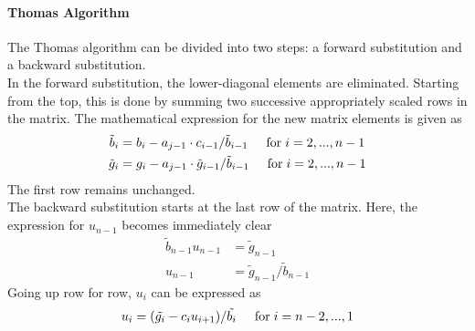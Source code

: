 \documentclass[%
oneside,                 %
final,                   %
10pt]{article}
\begin{document}
\paragraph{Thomas Algorithm}
The Thomas algorithm can be divided into two steps: a forward substitution and a backward substitution.\\
In the forward substitution, the lower-diagonal elements are eliminated. Starting from the top, this is done by summing two successive appropriately scaled rows in the matrix. The mathematical expression for the new matrix elements is given as
\begin{equation*}
\begin{aligned}
\tilde{b}_i &= b_i - a_{j-1} \cdot c_{i-1}/ \tilde{b}_{i-1}  \hspace{0.5cm} \mathrm{for} \hspace{0.1cm} i=2,..., n-1 \\
\tilde{g}_i &= g_i - a_{j-1} \cdot \tilde{g}_{i-1} / \tilde{b}_{i-1}  \hspace{0.5cm} \mathrm{for} \hspace{0.1cm} i=2,..., n-1
\end{aligned}
\end{equation*}
The first row remains unchanged. \\
The backward substitution starts at the last row of the matrix. Here, the expression for $u_{n-1}$ becomes immediately clear
\begin{equation*}
\begin{aligned}
\tilde{b}_{n-1} u_{n-1} &= \tilde{g}_{n-1} \\
u_{n-1} &= \tilde{g}_{n-1} / \tilde{b}_{n-1}
\end{aligned}
\end{equation*}
Going up row for row, $u_i$ can be expressed as
\begin{equation*}
u_i = ( \tilde{g_i}-c_i u_{i+1} )/ \tilde{b_i} \hspace{0.5cm} \mathrm{for} \hspace{0.1cm} i=n-2,...,1 
\end{equation*}
\end{document}
